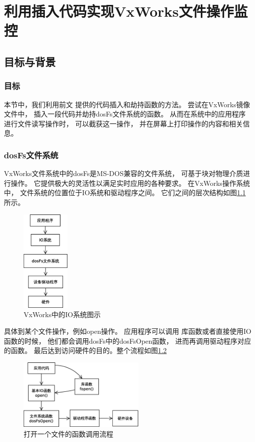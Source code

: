 \chapter{利用插入代码实现VxWorks文件操作监控}

\section{目标与背景}

\subsection{目标}

本节中，我们利用前文
提供的代码插入和劫持函数的方法。
尝试在VxWorks镜像文件中，
插入一段代码并劫持dosFs文件系统的函数。
从而在系统中的应用程序进行文件读写操作时，
可以截获这一操作，
并在屏幕上打印操作的内容和相关信息。

\subsection{dosFs文件系统}

VxWorks文件系统中的dosFs是MS-DOS兼容的文件系统，
可基于块对物理介质进行操作。
它提供极大的灵活性以满足实时应用的各种要求。
在VxWorks操作系统中，
文件系统的位置位于IO系统和驱动程序之间。
它们之间的层次结构如图\ref{iosys}所示。

\begin{figure}[h!]
    \centering
    \includegraphics[width=0.21\textwidth]{figure/IOsys.eps}
    \caption{VxWorks中的IO系统图示}
    \label{iosys}
\end{figure}

具体到某个文件操作，例如open操作。
应用程序可以调用
库函数或者直接使用IO函数的时候，
他们都会调用dosFs中的dosFsOpen函数，
进而再调用驱动程序对应的函数。
最后达到访问硬件的目的。整个流程如图\ref{open}

\begin{figure}[h!]
    \centering
\includegraphics[width=0.55\textwidth]{figure/open.eps}
    \caption{打开一个文件的函数调用流程}
    \label{open}
\end{figure}

